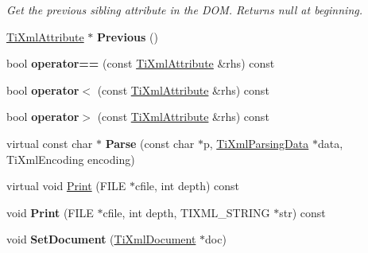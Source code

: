 \begin{DoxyCompactItemize}
\begin{DoxyCompactList}\small\item\em Get the previous sibling attribute in the DOM. Returns null at beginning. \item\end{DoxyCompactList}\item 
\hypertarget{class_ti_xml_attribute_ae4dabc932cba945ed1e92fec5f121193}{
\hyperlink{class_ti_xml_attribute}{TiXmlAttribute} $\ast$ {\bfseries Previous} ()}
\label{class_ti_xml_attribute_ae4dabc932cba945ed1e92fec5f121193}

\item 
\hypertarget{class_ti_xml_attribute_ae48c2a65b520d453914ce4e845d607cf}{
bool {\bfseries operator==} (const \hyperlink{class_ti_xml_attribute}{TiXmlAttribute} \&rhs) const }
\label{class_ti_xml_attribute_ae48c2a65b520d453914ce4e845d607cf}

\item 
\hypertarget{class_ti_xml_attribute_adb8b6f2cad5948e73e383182e7ce10de}{
bool {\bfseries operator$<$} (const \hyperlink{class_ti_xml_attribute}{TiXmlAttribute} \&rhs) const }
\label{class_ti_xml_attribute_adb8b6f2cad5948e73e383182e7ce10de}

\item 
\hypertarget{class_ti_xml_attribute_a867562769ef9778c1690cd373246b05b}{
bool {\bfseries operator$>$} (const \hyperlink{class_ti_xml_attribute}{TiXmlAttribute} \&rhs) const }
\label{class_ti_xml_attribute_a867562769ef9778c1690cd373246b05b}

\item 
\hypertarget{class_ti_xml_attribute_ad62774421b814894b995af3b5d231dda}{
virtual const char $\ast$ {\bfseries Parse} (const char $\ast$p, \hyperlink{class_ti_xml_parsing_data}{TiXmlParsingData} $\ast$data, TiXmlEncoding encoding)}
\label{class_ti_xml_attribute_ad62774421b814894b995af3b5d231dda}

\item 
virtual void \hyperlink{class_ti_xml_attribute_acc04956c1d5c4c31fe74f7a7528d109a}{Print} (FILE $\ast$cfile, int depth) const 
\item 
\hypertarget{class_ti_xml_attribute_a19e6b6862a80b188571c47947e88d030}{
void {\bfseries Print} (FILE $\ast$cfile, int depth, TIXML\_\-STRING $\ast$str) const }
\label{class_ti_xml_attribute_a19e6b6862a80b188571c47947e88d030}

\item 
\hypertarget{class_ti_xml_attribute_ac12a94d4548302afb12f488ba101f7d1}{
void {\bfseries SetDocument} (\hyperlink{class_ti_xml_document}{TiXmlDocument} $\ast$doc)}
\label{class_ti_xml_attribute_ac12a94d4548302afb12f488ba101f7d1}

\end{DoxyCompactItemize}
